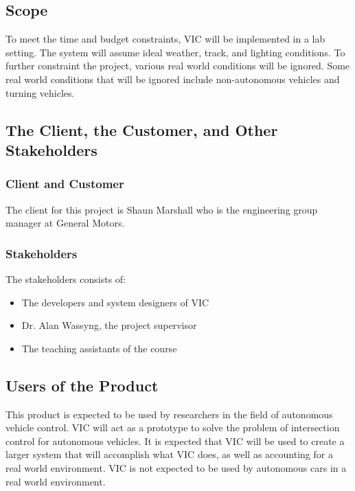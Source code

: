 \documentclass [11pt]{article}
\begin{document}
\subsection{Scope}
To meet the time and budget constraints, VIC will be implemented in a lab setting. The system will assume ideal weather, track, and lighting conditions. To further constraint the project, various real world conditions will be ignored. Some real world conditions that will be ignored include non-autonomous vehicles and turning vehicles. 

\subsection{The Client, the Customer, and Other Stakeholders}

\subsubsection{Client and Customer}
	The client for this project is Shaun Marshall who is the engineering group manager at General Motors. 


\subsubsection{Stakeholders}
 
 	The stakeholders consists of:
 		\begin{itemize}

 		\item The developers and system designers of VIC
 		\item Dr. Alan Wassyng, the project supervisor
 		\item The teaching assistants of the course
 		\end{itemize} 

\subsection{Users of the Product} 

This product is expected to be used by researchers in the field of autonomous vehicle control.  VIC will act as a prototype to solve the problem of intersection control for autonomous vehicles.  It is expected that VIC will be used to create a larger system that will accomplish what VIC does, as well as accounting for a real world environment.  VIC is not expected to be used by autonomous cars in a real world environment. 

\end{document}
